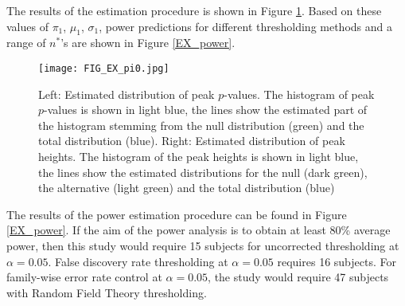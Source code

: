 The results of the estimation procedure is shown in Figure \ref{EX_pi0}.  Based on these values of $\pi_1$, $\mu_1$, $\sigma_1$, power predictions for different thresholding methods and a range of $n^*$'s are shown in Figure \ref{EX_power}.

\begin{center}
\begin{figure}[h]
\texttt{[image: FIG\_EX\_pi0.jpg]}
\caption{Left: Estimated distribution of peak $p$-values.  The histogram of peak $p$-values is shown in light blue, the lines show the estimated part of the histogram stemming from the null distribution (green) and the total distribution (blue).  Right: Estimated distribution of peak heights.  The histogram of the peak heights is shown in light blue, the lines show the estimated distributions for the null (dark green), the alternative (light green) and the total distribution (blue) \label{EX_pi0}}
\end{figure}
\end{center}


The results of the power estimation procedure can be found in Figure \ref{EX_power}. If the aim of the power analysis is to obtain at least 80\% average power, then this study would require 15 subjects for uncorrected thresholding at $\alpha=0.05$.  False discovery rate thresholding at $\alpha=0.05$ requires 16 subjects.  For family-wise error rate control at $\alpha=0.05$, the study would require 47 subjects with Random Field Theory thresholding.




